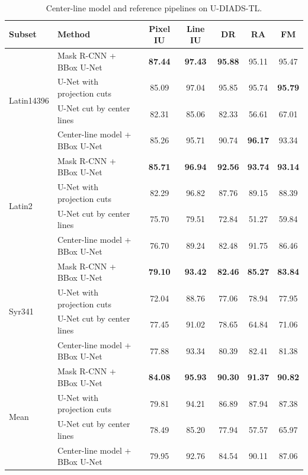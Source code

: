 \begin{table}[htbp]
    \centering
    \scriptsize
    \setlength{\tabcolsep}{4pt}
    \caption{Center-line model and reference pipelines on U-DIADS-TL.}
    \label{tab:udiads-center-line}
    \begin{tabular*}{\textwidth}{@{\extracolsep{\fill}}llccccc@{}}
        \toprule
        Subset & Method & Pixel IU & Line IU & DR & RA & FM \\
        \midrule
        \multirow{4}{*}{Latin14396} & Mask R-CNN + BBox U-Net & \textbf{87.44} & \textbf{97.43} & \textbf{95.88} & 95.11 & 95.47 \\
                                    & U-Net with projection cuts & 85.09 & 97.04 & 95.85 & 95.74 & \textbf{95.79} \\
        \cmidrule(l){2-7}
                                    & U-Net cut by center lines & 82.31 & 85.06 & 82.33 & 56.61 & 67.01 \\
                                    & Center-line model + BBox U-Net & 85.26 & 95.71 & 90.74 & \textbf{96.17} & 93.34 \\
        \midrule
        \multirow{4}{*}{Latin2} & Mask R-CNN + BBox U-Net & \textbf{85.71} & \textbf{96.94} & \textbf{92.56} & \textbf{93.74} & \textbf{93.14} \\
                                & U-Net with projection cuts & 82.29 & 96.82 & 87.76 & 89.15 & 88.39 \\
        \cmidrule(l){2-7}
                                & U-Net cut by center lines & 75.70 & 79.51 & 72.84 & 51.27 & 59.84 \\
                                & Center-line model + BBox U-Net & 76.70 & 89.24 & 82.48 & 91.75 & 86.46 \\
        \midrule
        \multirow{4}{*}{Syr341} & Mask R-CNN + BBox U-Net & \textbf{79.10} & \textbf{93.42} & \textbf{82.46} & \textbf{85.27} & \textbf{83.84} \\
                                & U-Net with projection cuts & 72.04 & 88.76 & 77.06 & 78.94 & 77.95 \\
        \cmidrule(l){2-7}
                                & U-Net cut by center lines & 77.45 & 91.02 & 78.65 & 64.84 & 71.06 \\
                                & Center-line model + BBox U-Net & 77.88 & 93.34 & 80.39 & 82.41 & 81.38 \\
        \midrule
        \multirow{4}{*}{Mean} & Mask R-CNN + BBox U-Net & \textbf{84.08} & \textbf{95.93} & \textbf{90.30} & \textbf{91.37} & \textbf{90.82} \\
                              & U-Net with projection cuts & 79.81 & 94.21 & 86.89 & 87.94 & 87.38 \\
        \cmidrule(l){2-7}
                              & U-Net cut by center lines & 78.49 & 85.20 & 77.94 & 57.57 & 65.97 \\
                              & Center-line model + BBox U-Net & 79.95 & 92.76 & 84.54 & 90.11 & 87.06 \\
        \bottomrule
    \end{tabular*}
\end{table}


